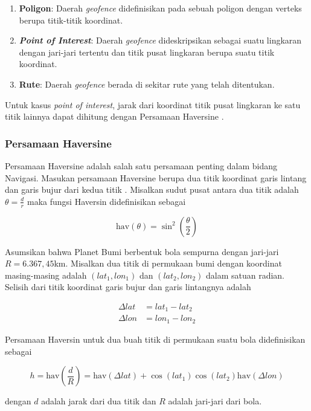 \begin{enumerate}
	\item \textbf{Poligon}: Daerah \textit{geofence} didefinisikan pada sebuah poligon dengan verteks berupa titik-titik koordinat.
	\item \textbf{\textit{Point of Interest}}: Daerah \textit{geofence} dideskripsikan sebagai suatu lingkaran dengan jari-jari tertentu dan titik pusat lingkaran berupa suatu titik koordinat.
	\item \textbf{Rute}: Daerah \textit{geofence} berada di sekitar rute yang telah ditentukan.
\end{enumerate}

Untuk kasus \textit{point of interest}, jarak dari koordinat titik pusat lingkaran ke satu titik lainnya dapat dihitung dengan Persamaan Haversine \cite{Pratama2020}.

\subsubsection{Persamaan Haversine}
Persamaan Haversine adalah salah satu persamaan penting dalam bidang Navigasi. Masukan persamaan Haversine berupa dua titik koordinat garis lintang dan garis bujur dari kedua titik \cite{Hofmann-Wellenhof2008}\cite{Feng2013}.  Misalkan sudut pusat antara dua titik adalah $\theta = \frac{d}{r}$ maka fungsi Haversin didefinisikan sebagai

$$\text{hav}(\theta) = \sin^2{\left(\frac{\theta}{2}\right)}$$

Asumsikan bahwa Planet Bumi berbentuk bola sempurna dengan jari-jari $R=6.367,45$km. Misalkan dua titik di permukaan bumi dengan koordinat masing-masing adalah $(lat_1, lon_1)$ dan $(lat_2, lon_2)$ dalam satuan radian. Selisih dari titik koordinat garis bujur dan garis lintangnya adalah

$$
\begin{aligned}
	\Delta lat &= lat_1 - lat_2 \\
	\Delta lon &= lon_1 - lon_2
\end{aligned}
$$

Persamaan Haversin untuk dua buah titik di permukaan suatu bola didefinisikan sebagai

$$
h = \mathrm{hav}\left(\frac{d}{R}\right) = \mathrm{hav}\left(\Delta lat\right) + \cos{\left(lat_1\right)} \cos{\left(lat_2\right)} \mathrm{hav}\left(\Delta lon\right)
$$

dengan $d$ adalah jarak dari dua titik dan $R$ adalah jari-jari dari bola.

